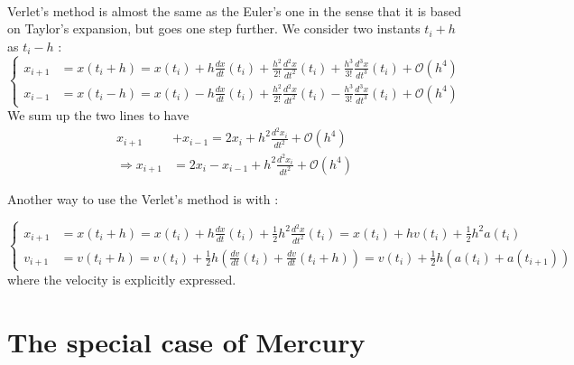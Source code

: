 \documentclass[a4paper, twoside, 11pt]{report}
\theoremstyle{theorem}
\theoremstyle{remark}
\theoremstyle{exemple}
\begin{document}
            \paragraph{}Verlet's method is almost the same as the Euler's one in the sense that it is based on Taylor's expansion, but goes one step further. We consider two instants $t_i+h$ as $t_i-h$ :
                \begin{equation*}
                    \left\{ 
                        \begin{aligned}
                            x_{i+1} &= x(t_i+h) = x(t_i) + h\frac{dx}{dt}(t_i) + \frac{h^2}{2!}\frac{d^2x}{dt^2}(t_i) + \frac{h^3}{3!}\frac{d^3x}{dt^3}(t_i)+\mathcal{O}(h^4)\\
                            x_{i-1} &= x(t_i-h) = x(t_i) - h\frac{dx}{dt}(t_i) + \frac{h^2}{2!}\frac{d^2x}{dt^2}(t_i) - \frac{h^3}{3!}\frac{d^3x}{dt^3}(t_i)+\mathcal{O}(h^4)
                        \end{aligned}
                    \right.
                \end{equation*}
            We sum up the two lines to have
                \begin{align*}
                    x_{i+1} &+ x_{i-1} = 2x_i + h^2\frac{d^2x_i}{dt^2} + \mathcal{O}(h^4) \\
                    \Rightarrow x_{i+1} &= 2x_i - x_{i-1} + h^2\frac{d^2x_i}{dt^2} + \mathcal{O}(h^4)
                \end{align*}
            
            Another way to use the Verlet's method is with :
            
                \begin{equation*}
                    \left\{
                        \begin{aligned}
                            x_{i+1}&=x(t_i+h) = x(t_i) + h\frac{dx}{dt}(t_i) + \frac{1}{2}h^2 \frac{d^2x}{dt^2}(t_i) =x(t_i) + hv(t_i) + \frac{1}{2}h^2 a(t_i) \\
                            v_{i+1}&=v(t_i+h) = v(t_i) + \frac{1}{2}h\left(\frac{dv}{dt}(t_i) + \frac{dv}{dt}(t_i+h)\right) =v(t_i) + \frac{1}{2}h\left(a(t_i) + a(t_{i+1})\right)
                        \end{aligned}
                    \right.
                \end{equation*}
            where the velocity is explicitly expressed.
            
        \section{The special case of Mercury}
        
\end{document}
